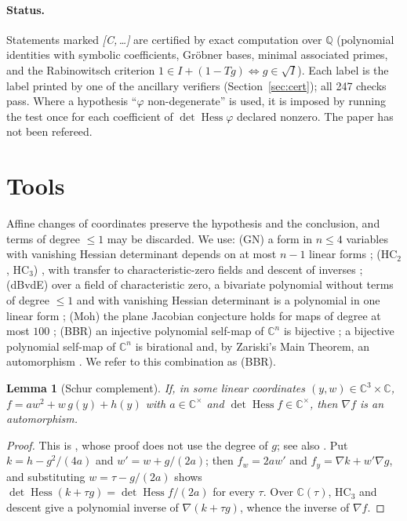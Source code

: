\documentclass[11pt]{article}
\newtheorem{lemma}[theorem]{Lemma}
\theoremstyle{remark}
\newcommand{\C}{\mathbb{C}}
\newcommand{\Q}{\mathbb{Q}}
\newcommand{\Hess}{\operatorname{Hess}}
\newcommand{\HC}{\mathrm{HC}}
\newcommand{\cert}[1]{\emph{[C,\,#1]}}
\begin{document}
\paragraph{Status.} Statements marked \cert{\dots} are certified by exact computation over $\Q$ (polynomial identities with symbolic coefficients, Gr\"obner bases, minimal associated primes, and the Rabinowitsch criterion $1\in I+(1-Tg)\Leftrightarrow g\in\sqrt I$). Each label is the label printed by one of the ancillary verifiers (Section~\ref{sec:cert}); all 247 checks pass. Where a hypothesis ``$\varphi$ non-degenerate'' is used, it is imposed by running the test once for each coefficient of $\det\Hess\varphi$ declared nonzero. The paper has not been refereed.

\section{Tools}\label{sec:tools}
Affine changes of coordinates preserve the hypothesis and the conclusion, and terms of degree $\le1$ may be discarded. We use:
(GN) a form in $n\le4$ variables with vanishing Hessian determinant depends on at most $n-1$ linear forms \cite{GN,deBondtQT};
($\HC_2$, $\HC_3$) \cite{Dillen,deBondt3}, with transfer to characteristic-zero fields and descent of inverses \cite[Lemmas~2.6, 2.7]{Ni};
(dBvdE) over a field of characteristic zero, a bivariate polynomial without terms of degree $\le1$ and with vanishing Hessian determinant is a polynomial in one linear form \cite[Thm.~3.1]{dBvdE};
(Moh) the plane Jacobian conjecture holds for maps of degree at most $100$ \cite{Moh};
(BBR) an injective polynomial self-map of $\C^n$ is bijective \cite{BBR}; a bijective polynomial self-map of $\C^n$ is birational and, by Zariski's Main Theorem, an automorphism \cite[Ch.~4]{vdE}. We refer to this combination as (BBR).

\begin{lemma}[Schur complement]\label{lem:A}
If, in some linear coordinates $(y,w)\in\C^3\times\C$, $f=aw^2+w\,g(y)+h(y)$ with $a\in\C^\times$ and $\det\Hess f\in\C^\times$, then $\nabla f$ is an automorphism.
\end{lemma}
\begin{proof}
This is \cite[Prop.~6.1, branch $a\ne0$]{Ni}, whose proof does not use the degree of $g$; see also \cite[Lemma~3]{NGtern}. Put $k=h-g^2/(4a)$ and $w'=w+g/(2a)$; then $f_w=2aw'$ and $f_y=\nabla k+w'\nabla g$, and substituting $w=\tau-g/(2a)$ shows $\det\Hess(k+\tau g)=\det\Hess f/(2a)$ for every $\tau$. Over $\C(\tau)$, $\HC_3$ and descent give a polynomial inverse of $\nabla(k+\tau g)$, whence the inverse of $\nabla f$.
\end{proof}
\end{document}
